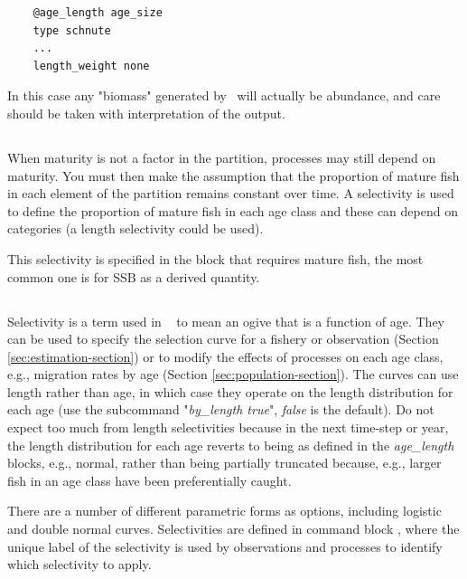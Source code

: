 {\small{\begin{verbatim}
	@age_length age_size
	type schnute
	...
	length_weight none
	\end{verbatim}}}

In this case any "biomass" generated by \CNAME~will actually be abundance, and care should be taken with interpretation of the output.

\subsection{\label{sec:maturity-notinpartition}}

When maturity is not a factor in the partition, processes may still depend on maturity. You must then make the assumption that the proportion of mature fish in each element of the partition remains constant over time. A selectivity is used to define the proportion of mature fish in each age class and these can depend on categories (a length selectivity could be used).

This selectivity is specified in the block that requires mature fish, the most common one is for SSB as a derived quantity. 

\subsection{\label{sec:selectivities}}

Selectivity is a term used in \CNAME~ to mean an ogive that is a function of age. They can be used to specify the selection curve for a fishery or observation  (Section \ref{sec:estimation-section}) or to modify the effects of processes on each age class, e.g., migration rates by age (Section \ref{sec:population-section}). The curves can use length rather than age, in which case they operate on the length distribution for each age (use the subcommand "\textit{by\_length true}", \textit{false} is the default). Do not expect too much from length selectivities because in the next time-step or year, the length distribution for each age reverts to being as defined in the \textit{age\_length} blocks, e.g., normal, rather than being partially truncated because, e.g., larger fish in an age class have been preferentially caught.

There are a number of different parametric forms as options, including logistic and double normal curves. Selectivities are defined in command block , where the unique label of the selectivity is used by observations and processes to identify which selectivity to apply.

